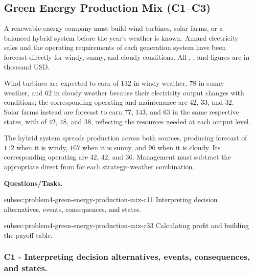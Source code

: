 
	\subsection{Green Energy Production Mix (C1--C3)}
	\label{sec:problem4-green-energy-production-mix-c1-c3}

	A renewable-energy company must build wind turbines, solar farms, or a balanced hybrid system before the year's weather is known. Annual electricity sales and the operating requirements of each generation system have been forecast directly for windy, sunny, and cloudy conditions. All , , and  figures are in thousand USD.

	Wind turbines are expected to earn  of \(132\) in windy weather, \(78\) in sunny weather, and \(62\) in cloudy weather because their electricity output changes with conditions; the corresponding operating and maintenance  are \(42\), \(33\), and \(32\). Solar farms instead are forecast to earn \(77\), \(143\), and \(63\) in the same respective states, with  of \(42\), \(48\), and \(38\), reflecting the resources needed at each output level.

	The hybrid system spreads production across both sources, producing forecast  of \(112\) when it is windy, \(107\) when it is sunny, and \(96\) when it is cloudy. Its corresponding operating  are \(42\), \(42\), and \(36\). Management must subtract the appropriate direct  from  for each strategy--weather combination.

	\textbf{Questions/Tasks.}
	\begin{enumerate}
		\CriterionTask
		{subsec:problem4-green-energy-production-mix-c1}{1}
		{Interpreting decision alternatives, events, consequences, and states.}

		\CriterionTask
		{subsec:problem4-green-energy-production-mix-c3}{3}
		{Calculating profit and building the payoff table.}
	\end{enumerate}

	\subsubsection*{C1 - Interpreting decision alternatives, events, consequences, and states.}
	\label{subsec:problem4-green-energy-production-mix-c1}

